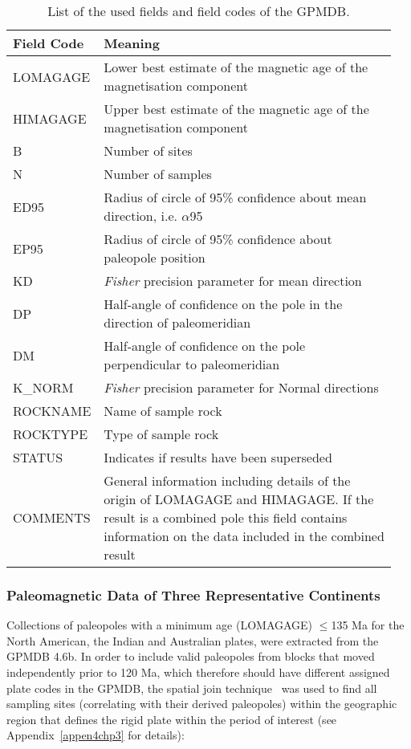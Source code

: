 \begin{table}
  \centering
  \caption{List of the used fields and field codes of the GPMDB.}\label{tab-fld}
  \begin{tabular}{p{0.16\linewidth} p{0.79\linewidth}}
    \toprule
    Field Code & Meaning \\ \midrule
    LOMAGAGE & Lower best estimate of the magnetic age of the magnetisation component \\
    HIMAGAGE & Upper best estimate of the magnetic age of the magnetisation component \\
    B & Number of sites \\
    N & Number of samples \\
    ED95 & Radius of circle of 95\% confidence about mean direction, i.e. $\alpha$95 \\
    EP95 & Radius of circle of 95\% confidence about paleopole position \\
    KD & \emph{Fisher} precision parameter for mean direction \\
    DP & Half-angle of confidence on the pole in the direction of paleomeridian \\
    DM & Half-angle of confidence on the pole perpendicular to paleomeridian \\
    K\_NORM & \emph{Fisher} precision parameter for Normal directions \\
    ROCKNAME & Name of sample rock \\
    ROCKTYPE & Type of sample rock \\
    STATUS & Indicates if results have been superseded \\
    COMMENTS & General information including details of the origin of LOMAGAGE
      and HIMAGAGE\@. If the result is a combined pole this field contains
      information on the data included in the combined result \\
    \bottomrule
  \end{tabular}
\end{table}

\subsubsection{Paleomagnetic Data of Three Representative Continents}

Collections of paleopoles with a minimum age (LOMAGAGE) $\leq$135 Ma for the
North American, the Indian and Australian plates, were extracted from the GPMDB
4.6b. In order to include valid paleopoles from blocks that moved independently
prior to 120 Ma, which therefore should have different assigned plate codes in
the GPMDB, the spatial join technique~\citep{J07} was used to find all sampling
sites (correlating with their derived paleopoles) within the geographic region
that defines the rigid plate within the period of interest (see
Appendix~\ref{appen4chp3} for details):

